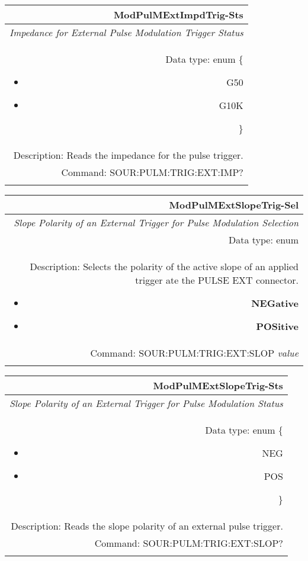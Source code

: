 \documentclass[openany]{article}
\begin{document}
		\begin{tabular}{N}
			\hline
			\bfseries ModPulMExtImpdTrig-Sts \\ \hline
			\emph{Impedance for External Pulse Modulation Trigger Status} \\
			Data type: enum \{\begin{itemize}[noitemsep]
				\small
				\item[] G50
				\item[] G10K
			\end{itemize}\} \\ 
			Description: Reads the impedance for the pulse trigger. \\
			Command: SOUR:PULM:TRIG:EXT:IMP? \\
			\\

		\end{tabular}


		\begin{tabular}{N}
			\hline
			\bfseries ModPulMExtSlopeTrig-Sel \\ \hline
			\emph{Slope Polarity of an External Trigger for Pulse Modulation Selection} \\
			Data type: enum \\  
			Description: Selects the polarity of the active slope of an applied trigger ate the PULSE EXT connector. \begin{itemize}[noitemsep]
				\small
				\item[] \textbf{NEGative}
                                \item[] \textbf{POSitive}
			\end{itemize} \\
			Command: SOUR:PULM:TRIG:EXT:SLOP \emph{value} \\
			\\

		\end{tabular}


		\begin{tabular}{N}
			\hline
			\bfseries ModPulMExtSlopeTrig-Sts \\ \hline
			\emph{Slope Polarity of an External Trigger for Pulse Modulation Status} \\
			Data type: enum \{\begin{itemize}[noitemsep]
				\small
				\item[] NEG
				\item[] POS
			\end{itemize}\} \\ 
			Description: Reads the slope polarity of an external pulse trigger. \\
			Command: SOUR:PULM:TRIG:EXT:SLOP? \\
			\\

		\end{tabular}
\end{document}
